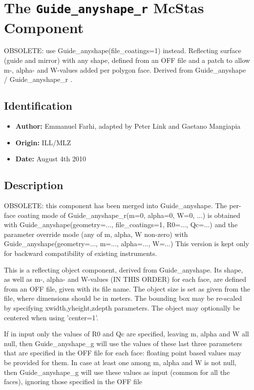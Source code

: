 \section{The \texttt{Guide\_anyshape\_r} McStas Component}
OBSOLETE: use Guide\_anyshape(file\_coatings=1) instead.
Reflecting surface (guide and mirror) with any shape, defined from an OFF file
and a patch to allow m-, alpha- and W-values added per polygon face.
Derived from Guide\_anyshape / Guide\_anyshape\_r .

\subsection*{Identification}
\begin{itemize}
  \item \textbf{Author:} Emmanuel Farhi, adapted by Peter Link and Gaetano Mangiapia
  \item \textbf{Origin:} ILL/MLZ
  \item \textbf{Date:} August 4th 2010
\end{itemize}

\subsection*{Description}
OBSOLETE: this component has been merged into Guide\_anyshape. The per-face coating mode of Guide\_anyshape\_r(m=0, alpha=0, W=0, ...) is obtained with Guide\_anyshape(geometry=..., file\_coatings=1, R0=..., Qc=...) and the parameter override mode (any of m, alpha, W non-zero) with Guide\_anyshape(geometry=..., m=..., alpha=..., W=...) This version is kept only for backward compatibility of existing instruments.

This is a reflecting object component, derived from Guide\_anyshape. Its shape, as well as m-, alpha- and W-values (IN THIS ORDER) for each face, are defined from an OFF file, given with its file name. The object size is set as given from the file, where dimensions should be in meters. The bounding box may be re-scaled by specifying xwidth,yheight,zdepth parameters. The object may optionally be centered when using 'center=1'.

If in input only the values of R0 and Qc are specified, leaving m, alpha and W all null, then Guide\_anyshape\_g will use the values of these last three parameters that are specified in the OFF file for each face: floating point based values may be provided for them. In case at least one among m, alpha and W is not null, then Guide\_anyshape\_g will use these values as input (common for all the faces), ignoring those specified in the OFF file

